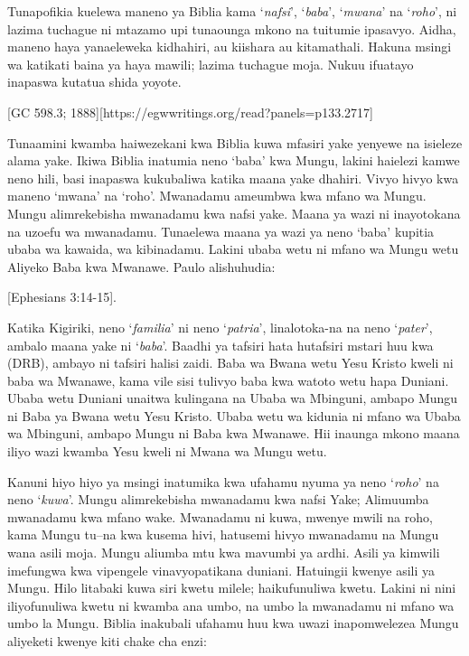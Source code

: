 Tunapofikia kuelewa maneno ya Biblia kama ‘\textit{nafsi}’, ‘\textit{baba}’, ‘\textit{mwana}’ na ‘\textit{roho}’, ni lazima tuchague ni mtazamo upi tunaounga mkono na tuitumie ipasavyo. Aidha, maneno haya yanaeleweka kidhahiri, au kiishara au kitamathali. Hakuna msingi wa katikati baina ya haya mawili; lazima tuchague moja. Nukuu ifuatayo inapaswa kutatua shida yoyote.


[GC 598.3; 1888][https://egwwritings.org/read?panels=p133.2717]

Tunaamini kwamba haiwezekani kwa Biblia kuwa mfasiri yake yenyewe na isieleze alama yake. Ikiwa Biblia inatumia neno ‘baba’ kwa Mungu, lakini haielezi kamwe neno hili, basi inapaswa kukubaliwa katika maana yake dhahiri. Vivyo hivyo kwa maneno ‘mwana’ na ‘roho’. Mwanadamu ameumbwa kwa mfano wa Mungu. Mungu alimrekebisha mwanadamu kwa nafsi yake. Maana ya wazi ni inayotokana na uzoefu wa mwanadamu. Tunaelewa maana ya wazi ya neno ‘baba’ kupitia ubaba wa kawaida, wa kibinadamu. Lakini ubaba wetu ni mfano wa Mungu wetu Aliyeko Baba kwa Mwanawe. Paulo alishuhudia:


[Ephesians 3:14-15].


Katika Kigiriki, neno ‘\textit{familia}’ ni neno ‘\textit{patria}’, linalotoka-na na neno ‘\textit{pater}’, ambalo maana yake ni ‘\textit{baba}’. Baadhi ya tafsiri hata hutafsiri mstari huu kwa  (DRB), ambayo ni tafsiri halisi zaidi. Baba wa Bwana wetu Yesu Kristo kweli ni baba wa Mwanawe, kama vile sisi tulivyo baba kwa watoto wetu hapa Duniani. Ubaba wetu Duniani unaitwa kulingana na Ubaba wa Mbinguni, ambapo Mungu ni Baba ya Bwana wetu Yesu Kristo. Ubaba wetu wa kidunia ni mfano wa Ubaba wa Mbinguni, ambapo Mungu ni Baba kwa Mwanawe. Hii inaunga mkono maana iliyo wazi kwamba Yesu kweli ni Mwana wa Mungu wetu.


Kanuni hiyo hiyo ya msingi inatumika kwa ufahamu nyuma ya neno ‘\textit{roho}’ na neno ‘\textit{kuwa}’. Mungu alimrekebisha mwanadamu kwa nafsi Yake; Alimuumba mwanadamu kwa mfano wake. Mwanadamu ni kuwa, mwenye mwili na roho, kama Mungu tu--na kwa kusema hivi, hatusemi hivyo mwanadamu na Mungu wana asili moja. Mungu aliumba mtu kwa mavumbi ya ardhi. Asili ya kimwili imefungwa kwa vipengele vinavyopatikana duniani. Hatuingii kwenye asili ya Mungu. Hilo litabaki kuwa siri kwetu milele; haikufunuliwa kwetu. Lakini ni nini iliyofunuliwa kwetu ni kwamba ana umbo, na umbo la mwanadamu ni mfano wa umbo la Mungu. Biblia inakubali ufahamu huu kwa uwazi inapomwelezea Mungu aliyeketi kwenye kiti chake cha enzi:


